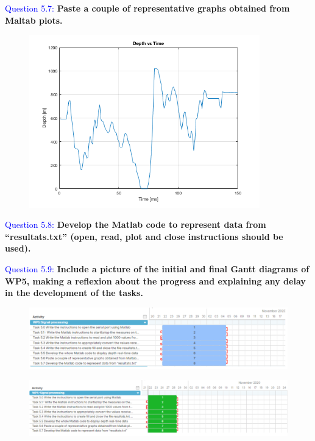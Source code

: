 \documentclass[12pt, a4papre]{article}
\begin{document}
	\textcolor{blue}{Question 5.7:} \textbf{Paste a couple of representative graphs obtained from Maltab plots.}
	
	\begin{figure}[H]
		\begin{center}
		\includegraphics[width=100mm]{pregunta5_7.png}
		\end{center}
	\end{figure}
	
	\textcolor{blue}{Question 5.8:} \textbf{Develop the Matlab code to represent data from “resultats.txt” (open, read, plot and close instructions should be used).}
	
	
	
	\textcolor{blue}{Question 5.9:} \textbf{Include a picture of the initial and final Gantt diagrams of WP5, making a reflexion about the progress and explaining any delay in the development of the tasks.}
	
	\begin{figure}[H]
		\begin{center}
		\includegraphics[width=135mm]{WP5_ini}
		\end{center}
	\end{figure}
	\begin{figure}[H]
		\begin{center}
		\includegraphics[width=135mm]{WP5_fin}
		\end{center}
	\end{figure}
	
\end{document}
